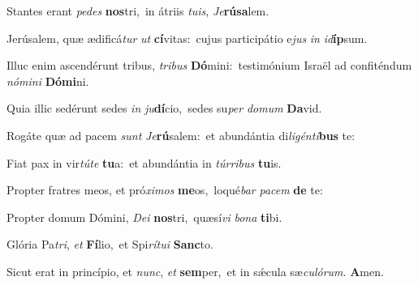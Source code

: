 \setcounter{versecount}{2}

\vs Stantes erant \textit{pe}\textit{des} \textbf{nos}tri,~\redgreheightstar in átriis \textit{tu}\textit{is}, \textit{Je}\textbf{rú}\textbf{sa}lem.

\vs Jerúsalem, quæ ædificá\textit{tur} \textit{ut} \textbf{cí}vitas:~\redgreheightstar cujus participátio e\textit{jus} \textit{in} \textit{id}\textbf{íp}sum.

\vs Illuc enim ascendérunt tribus, \textit{tri}\textit{bus} \textbf{Dó}mini:~\redgreheightstar testimónium Israël ad confiténdum \textit{nó}\textit{mi}\textit{ni} \textbf{Dó}\textbf{mi}ni.

\vs Quia illic sedérunt sedes \textit{in} \textit{ju}\textbf{dí}cio,~\redgreheightstar sedes su\textit{per} \textit{do}\textit{mum} \textbf{Da}vid.

\vs Rogáte quæ ad pacem \textit{sunt} \textit{Je}\textbf{rú}salem:~\redgreheightstar et abundántia di\textit{li}\textit{gén}\textit{ti}\textbf{bus} te:

\vs Fiat pax in vir\textit{tú}\textit{te} \textbf{tu}a:~\redgreheightstar et abundántia in \textit{túr}\textit{ri}\textit{bus} \textbf{tu}is.

\vs Propter fratres meos, et pró\textit{xi}\textit{mos} \textbf{me}os,~\redgreheightstar loqué\textit{bar} \textit{pa}\textit{cem} \textbf{de} te:

\vs Propter domum Dómini, \textit{De}\textit{i} \textbf{nos}tri,~\redgreheightstar quæsí\textit{vi} \textit{bo}\textit{na} \textbf{ti}bi.

\vs Glória Pa\textit{tri}, \textit{et} \textbf{Fí}lio,~\redgreheightstar et Spi\textit{rí}\textit{tu}\textit{i} \textbf{Sanc}to.

\vs Sicut erat in princípio, et \textit{nunc}, \textit{et} \textbf{sem}per,~\redgreheightstar et in sǽcula sæ\textit{cu}\textit{ló}\textit{rum}. \textbf{A}men.

